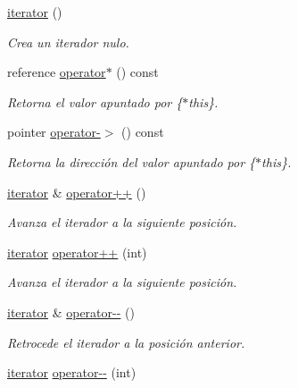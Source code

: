 \begin{DoxyCompactItemize}
\item 
\hyperlink{classaed2_1_1map_1_1iterator_acdd790eb54216601a2e0591776004dba}{iterator} ()
\begin{DoxyCompactList}\small\item\em \-Crea un iterador nulo. \end{DoxyCompactList}\item 
reference \hyperlink{classaed2_1_1map_1_1iterator_a48e75896997d516fe69bc18f889222fe}{operator$\ast$} () const 
\begin{DoxyCompactList}\small\item\em \-Retorna el valor apuntado por \{$\ast$this\}. \end{DoxyCompactList}\item 
pointer \hyperlink{classaed2_1_1map_1_1iterator_a227de3b56a6ff2e6bb6de2d08277ca60}{operator-\/$>$} () const 
\begin{DoxyCompactList}\small\item\em \-Retorna la dirección del valor apuntado por \{$\ast$this\}. \end{DoxyCompactList}\item 
\hyperlink{classaed2_1_1map_1_1iterator}{iterator} \& \hyperlink{classaed2_1_1map_1_1iterator_a7c44de7f0508186e135ddbcfe782fec5}{operator++} ()
\begin{DoxyCompactList}\small\item\em \-Avanza el iterador a la siguiente posición. \end{DoxyCompactList}\item 
\hyperlink{classaed2_1_1map_1_1iterator}{iterator} \hyperlink{classaed2_1_1map_1_1iterator_af4fe5565eb478cfccd254b2ef230b974}{operator++} (int)
\begin{DoxyCompactList}\small\item\em \-Avanza el iterador a la siguiente posición. \end{DoxyCompactList}\item 
\hyperlink{classaed2_1_1map_1_1iterator}{iterator} \& \hyperlink{classaed2_1_1map_1_1iterator_ae7f70f71545d2a9de17b65edaaec748a}{operator-\/-\/} ()
\begin{DoxyCompactList}\small\item\em \-Retrocede el iterador a la posición anterior. \end{DoxyCompactList}\item 
\hyperlink{classaed2_1_1map_1_1iterator}{iterator} \hyperlink{classaed2_1_1map_1_1iterator_add45e9ddbb8eeda99326cdb9ac9dd225}{operator-\/-\/} (int)

\end{DoxyCompactItemize}
